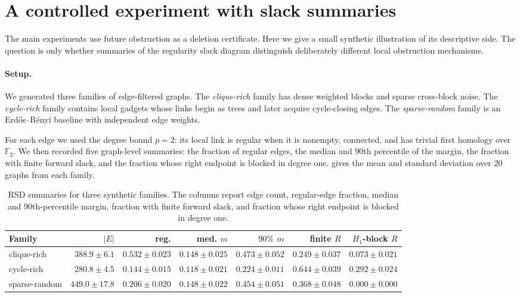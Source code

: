 \documentclass[11pt,letterpaper]{article}
\theoremstyle{definition}
\begin{document}
\section{A controlled experiment with slack summaries}
\label{app:rsd-experiment}

The main experiments use future obstruction as a deletion certificate. Here we
give a small synthetic illustration of its descriptive side. The question is
only whether summaries of the regularity slack diagram distinguish deliberately
different local obstruction mechanisms.

\paragraph{Setup.}
We generated three families of edge-filtered graphs. The \emph{clique-rich}
family has dense weighted blocks and sparse cross-block noise. The
\emph{cycle-rich} family contains local gadgets whose links begin as trees and
later acquire cycle-closing edges. The \emph{sparse-random} family is an
Erd\H{o}s--R\'enyi baseline with independent edge weights.

For each edge we used the degree bound $p=2$: its local link is regular when it
is nonempty, connected, and has trivial first homology over $\mathbb F_2$. We
then recorded five graph-level summaries: the fraction of regular edges, the
median and $90$th percentile of the margin, the fraction with finite forward
slack, and the fraction whose right endpoint is blocked in degree one.
 gives the mean and standard deviation over
$20$ graphs from each family.

\begin{table}[ht]
\centering
\scriptsize
\setlength{\tabcolsep}{2.8pt}
\renewcommand{\arraystretch}{1.05}
\begin{tabular}{@{}lrrrrrr@{}}
\toprule
Family
& \(|E|\)
& reg.
& med. \(m\)
& \(90\%\) \(m\)
& finite \(R\)
& \(H_1\)-block \(R\) \\
\midrule
clique-rich
& \(388.9\pm 6.1\)
& \(0.532\pm 0.023\)
& \(0.148\pm 0.025\)
& \(0.473\pm 0.052\)
& \(0.249\pm 0.037\)
& \(0.073\pm 0.021\) \\
cycle-rich
& \(280.8\pm 4.5\)
& \(0.144\pm 0.015\)
& \(0.118\pm 0.021\)
& \(0.224\pm 0.011\)
& \(0.644\pm 0.039\)
& \(0.292\pm 0.024\) \\
sparse-random
& \(449.0\pm 17.8\)
& \(0.206\pm 0.020\)
& \(0.148\pm 0.022\)
& \(0.454\pm 0.051\)
& \(0.368\pm 0.048\)
& \(0.000\pm 0.000\) \\
\bottomrule
\end{tabular}
\caption{RSD summaries for three synthetic families. The columns report edge
count, regular-edge fraction, median and $90$th-percentile margin, fraction
with finite forward slack, and fraction whose right endpoint is blocked in
degree one.}
\label{tab:rsd-structural-summaries}
\end{table}
\end{document}
